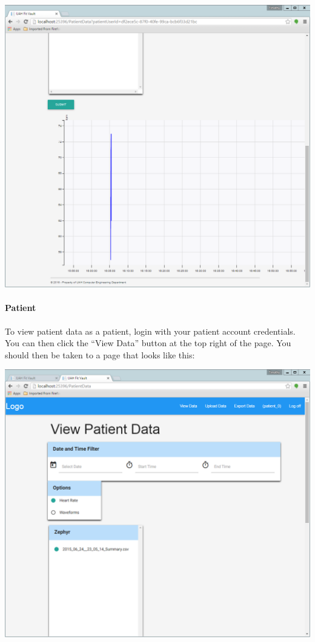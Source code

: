 \documentclass[letterpaper,10pt,english]{sphinxmanual}
\begin{document}
\includegraphics{view_patient_data_physician_2.png}


\paragraph{Patient}
\label{user_guide/patient_data_view:patient}
To view patient data as a patient, login with your patient account credentials. You can then click the ``View Data''
button at the top right of the page. You should then be taken to a page that looks like this:

\includegraphics{view_patient_data.png}
\end{document}
